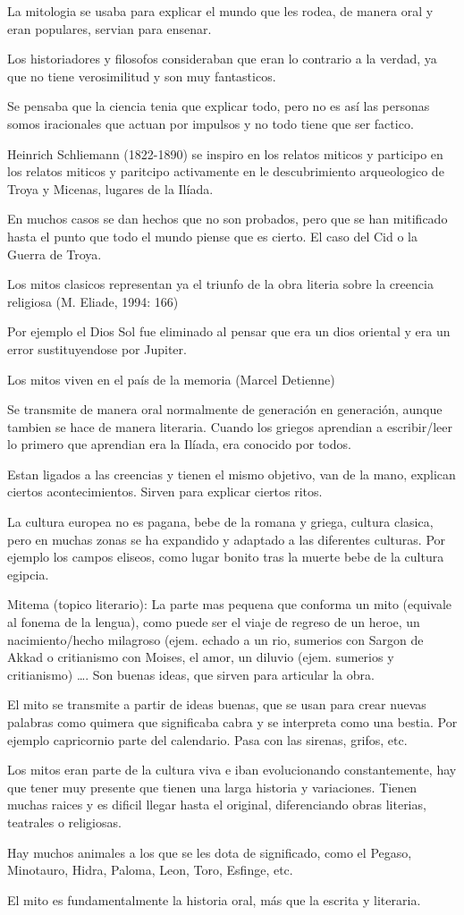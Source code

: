 \documentclass[12pt, twoside, openright]{report} %
\begin{document}
La mitologia se usaba para explicar el mundo que les rodea, de manera oral y eran populares, servian para ensenar.

Los historiadores y filosofos consideraban que eran lo contrario a la verdad, ya que no tiene verosimilitud y son muy fantasticos.

Se pensaba que la ciencia tenia que explicar todo, pero no es así las personas somos iracionales que actuan por impulsos y no todo tiene que ser factico.

Heinrich Schliemann (1822-1890) se inspiro en los relatos miticos y participo en los relatos miticos y paritcipo activamente en le descubrimiento arqueologico de Troya y Micenas, lugares de la Ilíada.

En muchos casos se dan hechos que no son probados, pero que se han mitificado hasta el punto que todo el mundo piense que es cierto. El caso del Cid o la Guerra de Troya.

Los mitos clasicos representan ya el triunfo de la obra literia sobre la creencia religiosa (M. Eliade, 1994: 166)

  Por ejemplo el Dios Sol fue eliminado al pensar que era un dios oriental y era un error sustituyendose por Jupiter.

  Los mitos viven en el país de la memoria (Marcel Detienne)

  Se transmite de manera oral normalmente de generación en generación, aunque tambien se hace de manera literaria. Cuando los griegos aprendian a escribir/leer lo primero que aprendian era la Ilíada, era conocido por todos.

  Estan ligados a las creencias y tienen el mismo objetivo, van de la mano, explican ciertos acontecimientos. Sirven para explicar ciertos ritos.

  La cultura europea no es pagana, bebe de la romana y griega, cultura clasica, pero en muchas zonas se ha expandido y adaptado a las diferentes culturas. Por ejemplo los campos eliseos, como lugar bonito tras la muerte bebe de la cultura egipcia.

  Mitema (topico literario): La parte mas pequena que conforma un mito (equivale al fonema de la lengua), como puede ser el viaje de regreso de un heroe, un nacimiento/hecho milagroso (ejem. echado a un rio, sumerios con Sargon de Akkad o critianismo con Moises, el amor, un diluvio (ejem. sumerios y critianismo) \ldots. Son buenas ideas, que sirven para articular la obra.


  El mito se transmite a partir de ideas buenas, que se usan para crear nuevas palabras como quimera que significaba cabra y se interpreta como una bestia. Por ejemplo capricornio parte del calendario. Pasa con las sirenas, grifos, etc.

  Los mitos eran parte de la cultura viva e iban evolucionando constantemente, hay que tener muy presente que tienen una larga historia y variaciones. Tienen muchas raices y es dificil llegar hasta el original, diferenciando obras literias, teatrales o religiosas.

Hay muchos animales a los que se les dota de significado, como el Pegaso, Minotauro, Hidra, Paloma, Leon, Toro, Esfinge, etc.

  El mito es fundamentalmente la historia oral, más que la escrita y literaria.
\end{document}
